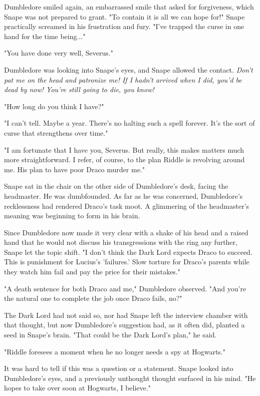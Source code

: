 \documentclass[a4paper,11pt]{article}
\begin{document}
Dumbledore smiled again, an embarrassed smile that asked for forgiveness, which Snape was not prepared to grant. "To contain it is all we can hope for!" Snape practically screamed in his frustration and fury. "I've trapped the curse in one hand for the time being..."

"You have done very well, Severus."

Dumbledore was looking into Snape's eyes, and Snape allowed the contact. \emph{Don't pat me on the head and patronize me! If I hadn't arrived when I did, you'd be dead by now! You're still going to die, you know!}

"How long do you think I have?"

"I can't tell. Maybe a year. There's no halting such a spell forever. It's the sort of curse that strengthens over time."

"I am fortunate that I have you, Severus. But really, this makes matters much more straightforward. I refer, of course, to the plan Riddle is revolving around me. His plan to have poor Draco murder me."

Snape sat in the chair on the other side of Dumbledore's desk, facing the headmaster. He was dumbfounded. As far as he was concerned, Dumbledore's recklessness had rendered Draco's task moot. A glimmering of the headmaster's meaning was beginning to form in his brain.

Since Dumbledore now made it very clear with a shake of his head and a raised hand that he would not discuss his transgressions with the ring any further, Snape let the topic shift. "I don't think the Dark Lord expects Draco to succeed. This is punishment for Lucius's 'failures.' Slow torture for Draco's parents while they watch him fail and pay the price for their mistakes."

"A death sentence for both Draco and me," Dumbledore observed. "And you're the natural one to complete the job once Draco fails, no?"

The Dark Lord had not said so, nor had Snape left the interview chamber with that thought, but now Dumbledore's suggestion had, as it often did, planted a seed in Snape's brain. "That could be the Dark Lord's plan," he said.

"Riddle foresees a moment when he no longer needs a spy at Hogwarts."

It was hard to tell if this was a question or a statement. Snape looked into Dumbledore's eyes, and a previously unthought thought surfaced in his mind. "He hopes to take over soon at Hogwarts, I believe."
\end{document}
